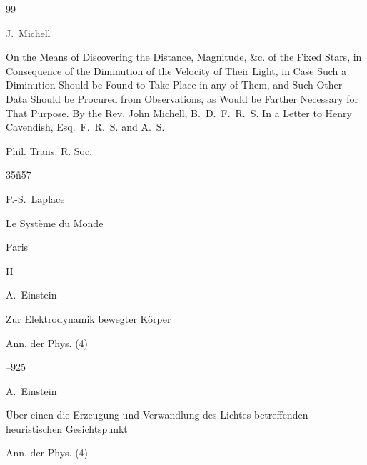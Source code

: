 \def\refname{REFERENCES}

\begin{thebibliography}{99}




\by J.~Michell

\paper On the Means of Discovering the Distance, Magnitude, \&c. of the Fixed Stars, in Consequence of the Diminution of the Velocity of Their Light, in Case Such a Diminution Should be Found to Take Place in any of Them, and Such Other Data Should be Procured from Observations, as Would be Farther Necessary for That Purpose. By the Rev. John Michell, B.~D.~F.~R.~S. In a Letter to Henry Cavendish, Esq.~F.~R.~S. and A.~S.

\jour Phil. Trans. R. Soc.



\pages 35ñ57





\by P.-S.~Laplace

\book Le Syst\`eme du Monde


\publaddr Paris

\bookvol II






\by A.~Einstein

\paper Zur Elektrodynamik bewegter K\"orper

\jour Ann. der Phys. (4)



--925






\by A.~Einstein

\paper \"Uber einen die Erzeugung und Verwandlung des Lichtes betreffenden heuristischen Gesichtspunkt

\jour Ann. der Phys. (4)



\end{thebibliography}

